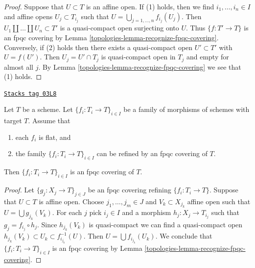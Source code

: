 \begin{proof}

Suppose that $U \subset T$ is an affine open. If (1) holds, then we find
$i_1, \ldots, i_n \in I$ and affine opens $U_j \subset T_{i_j}$ such that
$U = \bigcup_{j = 1, \ldots, n} f_{i_j}(U_j)$. Then
$U_1 \amalg \ldots \amalg U_n \subset T'$ is a quasi-compact open surjecting
onto $U$. Thus $\{f : T' \to T\}$ is an fpqc covering by
Lemma \ref{topologies-lemma-recognize-fpqc-covering}.
Conversely, if (2) holds then there exists a quasi-compact open
$U' \subset T'$ with $U = f(U')$. Then $U_j = U' \cap T_j$ is quasi-compact
open in $T_j$ and empty for almost all $j$. By
Lemma \ref{topologies-lemma-recognize-fpqc-covering} we see that (1) holds.
\end{proof}

\begin{lemma}
\label{topologies-lemma-family-flat-dominated-covering}
\href{https://stacks.math.columbia.edu/tag/03L8}{\texttt{Stacks tag 03L8}}

Let $T$ be a scheme. Let $\{f_i : T_i \to T\}_{i \in I}$ be a family of
morphisms of schemes with target $T$. Assume that
\begin{enumerate}
\item each $f_i$ is flat, and
\item the family $\{f_i : T_i \to T\}_{i \in I}$ can be refined by an
fpqc covering of $T$.
\end{enumerate}
Then $\{f_i : T_i \to T\}_{i \in I}$ is an fpqc covering of $T$.
\end{lemma}

\begin{proof}

Let $\{g_j : X_j \to T\}_{j \in J}$ be an fpqc covering refining
$\{f_i : T_i \to T\}$. Suppose that $U \subset T$ is affine open.
Choose $j_1, \ldots, j_m \in J$ and $V_k \subset X_{j_k}$ affine
open such that $U = \bigcup g_{j_k}(V_k)$. For each $j$ pick $i_j \in I$
and a morphism $h_j : X_j \to T_{i_j}$ such that $g_j = f_{i_j} \circ h_j$.
Since $h_{j_k}(V_k)$ is quasi-compact we can find a quasi-compact
open $h_{j_k}(V_k) \subset U_k \subset f_{i_{j_k}}^{-1}(U)$.
Then $U = \bigcup f_{i_{j_k}}(U_k)$. We conclude that
$\{f_i : T_i \to T\}_{i \in I}$ is an fpqc covering by
Lemma \ref{topologies-lemma-recognize-fpqc-covering}.
\end{proof}

